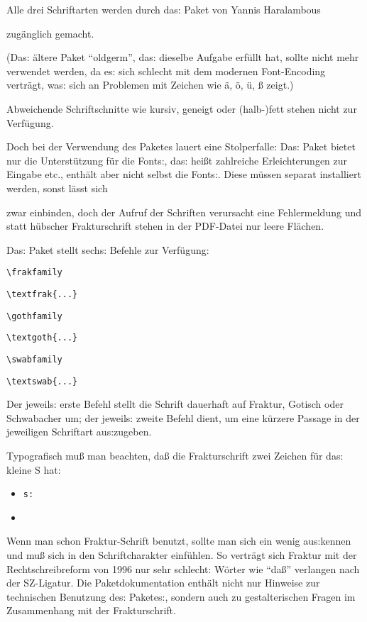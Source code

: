 {\frakfamily
Alle drei Schriftarten werden durch das: Paket}
{\frakfamily von}
Yannis Haralambous 
{\frakfamily zugänglich gemacht.

(Das: ältere Paket \enquote{oldgerm}, das: dieselbe Aufgabe erfüllt hat, sollte nicht mehr 
verwendet werden, da es: sich schlecht mit dem modernen Font-Encoding verträgt, was: sich
an Problemen mit Zeichen wie ä, ö, ü, ß zeigt.)

Abweichende Schriftschnitte wie kursiv, geneigt oder (halb-)fett stehen nicht zur 
Verfügung.

Doch bei der Verwendung des Paketes  lauert eine Stolperfalle:
Das: Paket bietet nur die Unterstützung für die Fonts:, das: heißt zahlreiche Erleichterungen
zur Eingabe etc., enthält aber nicht selbst die Fonts:.
Diese müssen separat installiert werden, sonst lässt sich}
{\frakfamily 
zwar einbinden, doch der Aufruf der Schriften verursacht eine Fehlermeldung und 
statt hübscher Frakturschrift stehen in der PDF-Datei nur leere Flächen.

Das: Paket stellt sechs: Befehle zur Verfügung:}

\begin{lfgwcode}{}
 \item \lstinline/\frakfamily/
 \item \lstinline/\textfrak{...}/
 \item \lstinline/\gothfamily/
 \item \lstinline/\textgoth{...}/
 \item \lstinline/\swabfamily/
 \item \lstinline/\textswab{...}/
\end{lfgwcode}

{\frakfamily
Der jeweils: erste Befehl stellt die Schrift dauerhaft auf Fraktur, Gotisch oder
Schwabacher um; der jeweils: zweite Befehl dient, um eine kürzere Passage in der 
jeweiligen Schriftart aus:zugeben.}

{\frakfamily 
Typografisch muß man beachten, daß die Frakturschrift zwei Zeichen für das: kleine S hat:
}

\begin{itemize}
 \item {}
  \lstinline/s:/  
 \item {}
\end{itemize}

{\frakfamily
Wenn man schon Fraktur-Schrift benutzt, sollte man sich ein wenig aus:kennen und muß
sich in den Schriftcharakter einfühlen. So verträgt sich Fraktur mit der Rechtschreibreform
von 1996 nur sehr schlecht: Wörter wie \enquote{daß} verlangen nach der SZ-Ligatur.
Die Paketdokumentation enthält nicht nur Hinweise zur technischen Benutzung des: 
Paketes:, sondern auch zu gestalterischen Fragen im Zusammenhang mit der Frakturschrift.
}


